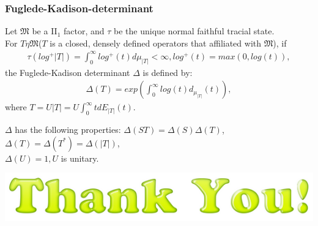 \documentclass{beamer}
\newcommand{\LLL}{\mathcal L} %
\newcommand{\MMM}{\mathfrak M}
\begin{document}
\begin{frame}
\frametitle{Fuglede-Kadison-determinant}
Let $\MMM$ be a II$_1$ factor, and $\tau$ be the unique normal faithful tracial
state.\\

For $T\eta \MMM$($T$ is a closed, densely defined operators that affiliated
with $\MMM$), if
\begin{align*}
\tau(log^{+}|T|) = \int^{\infty}_{0}log^{+}(t)d\mu_{|T|} < \infty, log^{+}(t) =
max(0, log(t)),
\end{align*}
the Fuglede-Kadison determinant $\Delta$ is defined by:
\begin{align*}
\Delta(T) = exp(\int^{\infty}_{0}log(t)d_{\mu_{|T|}}(t)),
\end{align*}
where $T = U|T| = U\int_{0}^{\infty}tdE_{|T|}(t)$.


\end{frame}

\begin{frame}
$\Delta$ has the following properties:
$\Delta(ST) = \Delta(S)\Delta(T)$,\\
$\Delta(T) = \Delta(T^{*}) = \Delta(|T|)$,\\
$\Delta(U) = 1, U$ is unitary.\\


\visible<3->{
\begin{theorem}
$G[\LLL] \approx S_3$.
\end{theorem}
}
\end{frame}



\begin{frame}
\begin{center}
\includegraphics[scale = 0.7]{thy.png}
\end{center} 
\end{frame}
\end{document}
